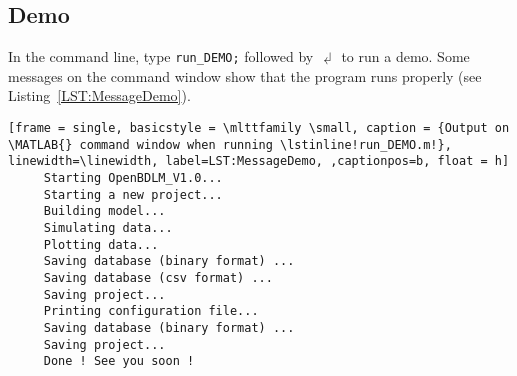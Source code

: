 \subsection{Demo}

In the \MATLAB{} command line, type  
\colorbox{light-gray}{\lstinline[basicstyle = \mlttfamily \small, backgroundcolor = \color{light-gray}]!run_DEMO;! }
 followed by $\dlsh$ to run a demo. 
Some messages on the \MATLAB{} command window show that the program runs properly (see Listing~\ref{LST:MessageDemo}).

\begin{lstlisting}[frame = single, basicstyle = \mlttfamily \small, caption = {Output on \MATLAB{} command window when running \lstinline!run_DEMO.m!}, linewidth=\linewidth, label=LST:MessageDemo, ,captionpos=b, float = h] 
     Starting OpenBDLM_V1.0...
     Starting a new project...
     Building model...
     Simulating data...
     Plotting data...
     Saving database (binary format) ...
     Saving database (csv format) ...
     Saving project...
     Printing configuration file...
     Saving database (binary format) ...
     Saving project...
     Done ! See you soon !
\end{lstlisting}